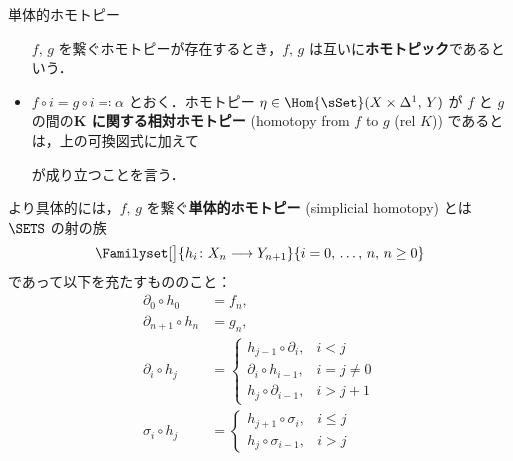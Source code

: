 \documentclass[TQFT_main]{subfiles}
\begin{document}
\begin{mydef}[label=def:SimpSet-homotopic,breakable]{単体的ホモトピー}
\begin{itemize}
        $f,\, g$ を繋ぐホモトピーが存在するとき，$f,\, g$ は互いに\textbf{ホモトピック}であるという．
        \item $f \circ i = g \circ i \eqqcolon \alpha$ とおく．ホモトピー $\eta \in \Hom{\sSet} (X \times \Delta^1,\, Y)$ が $f$ と $g$ の間の\textbf{$\bm{K}$ に関する相対ホモトピー} (homotopy from $f$ to $g$ (rel $K$)) であるとは，上の可換図式に加えて
        \begin{center}
        \end{center}
        が成り立つことを言う．
    \end{itemize}
    
    \tcblower

    より具体的には，$f,\, g$ を繋ぐ\textbf{単体的ホモトピー} (simplicial homotopy) とは $\SETS$ の射の族
    \begin{align}
        \Familyset[\big]{h_i \colon X_n \lto Y_{n+1}}{i = 0,\, \dots,\, n,\, n \ge 0}
    \end{align}
    であって以下を充たすもののこと：
    \begin{align}
        \partial_0 \circ h_0 &= f_n, \\
        \partial_{n+1} \circ h_n &= g_n, \\
        \partial_i \circ h_j &=
        \begin{cases}
            h_{j-1} \circ \partial_{i}, &i < j \\
            \partial_i \circ h_{i-1}, &i=j \neq 0 \\
            h_j \circ \partial_{i-1}, &i > j+1
        \end{cases} \\
        \sigma_i \circ h_j &=
        \begin{cases}
            h_{j+1} \circ \sigma_i, &i \le j \\
            h_j \circ \sigma_{i-1}, &i > j
        \end{cases}
    \end{align}
\end{mydef}
\end{document}
